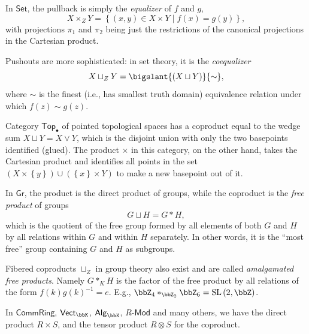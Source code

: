 %
\begin{example}\label{pullbacks in Set}
In $\mathsf{Set}$, the pullback is simply the \emph{equalizer}
of $f$ and $g$, 
\[
X\times_{Z}Y=\left\{ \left(x,y\right)\in X\times Y\mid f(x)=g(y)\right\} ,
\]
with projections $\pi_{1}$ and $\pi_{2}$ being just the restrictions
of the canonical projections in the Cartesian product.

Pushouts are more sophisticated: in set theory, it is the \emph{coequalizer}
\[
X\sqcup_{Z}Y=\bigslant{\left(X\sqcup Y\right)}{\sim},
\]
where $\sim$ is the finest (i.e., has smallest truth domain) equivalence
relation under which $f(z)\sim g(z)$.
\end{example}
%
\begin{example}
Category $\mathsf{Top}_{\bullet}$ of pointed topological spaces has
a coproduct equal to the wedge sum $X\sqcup Y=X\vee Y$, which is
the disjoint union with only the two basepoints identified (glued).
The product $\times$ in this category, on the other hand, takes the
Cartesian product and identifies all points in the set $\left(X\times\left\{ y\right\} \right)\cup\left(\left\{ x\right\} \times Y\right)$
to make a new basepoint out of it.
\end{example}
%
\begin{example}\label{pushouts in groups}
In $\mathsf{Gr}$, the product is the direct product of groups, while
the coproduct is the \emph{free product} of groups 
\[
G\sqcup H=G\ast H,
\]
which is the quotient of the free group formed by all elements of
both $G$ and $H$ by all relations within $G$ and within $H$ separately.
In other words, it is the ``most free'' group containing $G$ and
$H$ as subgroups. 

Fibered coproducts $\sqcup_{Z}$ in group theory also exist and are
called \emph{amalgamated free products}. Namely $G\ast_K H$ is the factor of the free product by all relations of the form $f(k)g(k)^{-1}=e$. E.g., $\bbZ_{4}\ast_{\bbZ_{2}}\bbZ_{6}=\mathrm{SL}\left(2,\bbZ\right)$.
\end{example}
%
\begin{example}
In $\mathsf{CommRing}$, $\mathsf{Vect}_{\bbK}$, $\mathsf{Alg}_{\bbK}$,
$R\text{-}\mathsf{Mod}$ and many others, we have the direct product
$R\times S$, and the tensor product $R\otimes S$ for the coproduct.
\end{example}

